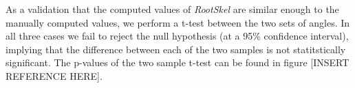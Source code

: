 \begin{figure}[h!]
\end{figure}


As a validation that the computed values of \textit{RootSkel} are similar enough to the manually computed values, we perform a t-test between the two sets of angles.
In all three cases we fail to reject the null hypothesis (at a 95\% confidence interval), implying that the difference between each of the two samples is not statitstically significant. The p-values of the two sample t-test can be found in figure [INSERT REFERENCE HERE].








%
%



